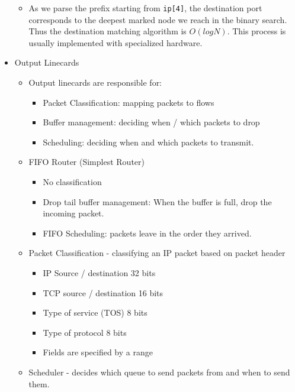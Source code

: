 \begin{itemize}
  \begin{itemize}
  \tightlist
  \item
    As we parse the prefix starting from \texttt{ip{[}4{]}}, the
    destination port corresponds to the deepest marked node we reach in
    the binary search. Thus the destination matching algorithm is
    \(O(logN)\). This process is usually implemented with specialized
    hardware.
  \end{itemize}
\item
  Output Linecards

  \begin{itemize}
  \tightlist
  \item
    Output linecards are responsible for:

    \begin{itemize}
    \tightlist
    \item
      Packet Classification: mapping packets to flows
    \item
      Buffer management: deciding when / which packets to drop
    \item
      Scheduling: deciding when and which packets to transmit.
    \end{itemize}
  \item
    FIFO Router (Simplest Router)

    \begin{itemize}
    \tightlist
    \item
      No classification
    \item
      Drop tail buffer management: When the buffer is full, drop the
      incoming packet.
    \item
      FIFO Scheduling: packets leave in the order they arrived.
    \end{itemize}
  \item
    Packet Classification - classifying an IP packet based on packet
    header

    \begin{itemize}
    \tightlist
    \item
      IP Source / destination 32 bits
    \item
      TCP source / destination 16 bits
    \item
      Type of service (TOS) 8 bits
    \item
      Type of protocol 8 bits
    \item
      Fields are specified by a range
    \end{itemize}
  \item
    Scheduler - decides which queue to send packets from and when to
    send them.


\end{itemize}
\end{itemize}
